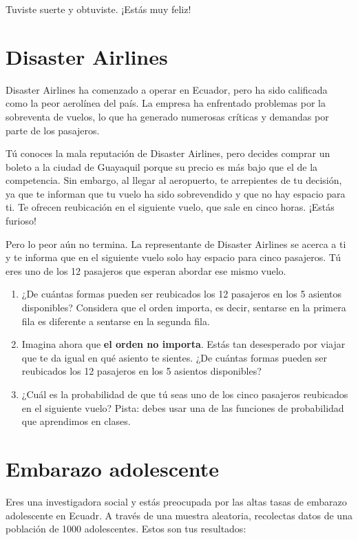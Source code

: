 \documentclass[a4paper]{article}
\begin{document}
Tuviste suerte y obtuviste. ¡Estás muy feliz!

\newpage

\section*{Disaster Airlines}

Disaster Airlines ha comenzado a operar en Ecuador, pero ha sido calificada como la peor aerolínea del país.
La empresa ha enfrentado problemas por la sobreventa de vuelos, lo que ha generado numerosas críticas y demandas por parte de los pasajeros.

Tú conoces la mala reputación de Disaster Airlines, pero decides comprar un boleto a la ciudad de Guayaquil porque su precio es más bajo que el de la competencia. Sin embargo, al llegar al aeropuerto, te arrepientes de tu decisión, ya que te informan que tu vuelo ha sido sobrevendido y que no hay espacio para ti. Te ofrecen reubicación en el siguiente vuelo, que sale en cinco horas. ¡Estás furioso!

Pero lo peor aún no termina. La representante de Disaster Airlines se acerca a ti y te informa que en el siguiente vuelo solo hay espacio para cinco pasajeros. Tú eres uno de los 12 pasajeros que esperan abordar
ese mismo vuelo.

\begin{enumerate}[label=\alph*.]
	\item ¿De cuántas formas pueden ser reubicados los 12 pasajeros en los 5 asientos disponibles? Considera que el orden importa, es decir, sentarse en la primera fila es diferente a sentarse en la segunda fila.
	\item Imagina ahora que \textbf{el orden no importa}. Estás tan desesperado por viajar que te da igual en qué asiento te sientes. ¿De cuántas formas pueden ser reubicados los 12 pasajeros en los 5 asientos
	disponibles?
	\item ¿Cuál es la probabilidad de que tú seas uno de los cinco pasajeros reubicados en el siguiente vuelo?
	Pista: debes usar una de las funciones de probabilidad que aprendimos en clases.
\end{enumerate}


\section*{Embarazo adolescente}

Eres una investigadora social y estás preocupada por las altas tasas de embarazo adolescente en Ecuadr. A través de una muestra aleatoria, recolectas datos de una población de 1000 adolescentes. Estos son tus resultados:
\end{document}
